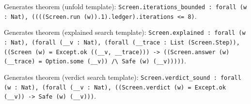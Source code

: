 \documentclass[11pt]{article}
\begin{document}
\noindent Generates theorem (unfold template): \texttt{Screen.iterations\_bounded : forall (w : Nat), ((((Screen.run (w)).1).ledger).iterations <= 8)}.\par
\noindent Generates theorem (explained search template): \texttt{Screen.explained : forall (w : Nat), (forall (\_\_v : Nat), (forall (\_\_trace : List (Screen.Step)), ((Screen (w) = Except.ok ((\_\_v, \_\_trace))) -> ((Screen.answer (w) (\_\_trace) = Option.some (\_\_v)) /\textbackslash{} Safe (w) (\_\_v)))))}.\par
\noindent Generates theorem (verdict search template): \texttt{Screen.verdict\_sound : forall (w : Nat), (forall (\_\_v : Nat), ((Screen.verdict (w) = Except.ok (\_\_v)) -> Safe (w) (\_\_v)))}.\par
\end{document}
